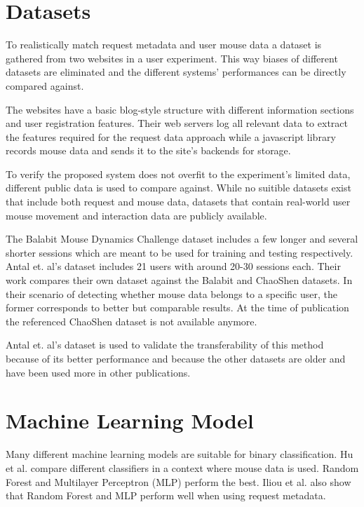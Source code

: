 \documentclass[
    fontsize=12pt,
    headings=small,
    parskip=half,           %
    bibliography=totoc,
    numbers=noenddot,       %
    open=any,               %
    final,                   %
    table
]{scrreprt}
\begin{document}
\section{Datasets}

To realistically match request metadata and user mouse data a dataset is gathered from two websites in a user experiment. This way biases of different datasets are eliminated and the different systems' performances can be directly compared against.

The websites have a basic blog-style structure with different information sections and user registration features. Their web servers log all relevant data to extract the features required for the request data approach while a javascript library records mouse data and sends it to the site's backends for storage.

To verify the proposed system does not overfit to the experiment's limited data, different public data is used to compare against. While no suitible datasets exist that include both request and mouse data, datasets that contain real-world user mouse movement and interaction data are publicly available.

The Balabit Mouse Dynamics Challenge dataset \cite{BALABIT_CHALLENGE} includes a few longer and several shorter sessions which are meant to be used for training and testing respectively.
Antal et. al's dataset \cite{9111596} includes 21 users with around 20-30 sessions each. Their work compares their own dataset against the Balabit and ChaoShen datasets. In their scenario of detecting whether mouse data belongs to a specific user, the former corresponds to better but comparable results.
At the time of publication the referenced ChaoShen dataset is not available anymore.

Antal et. al's dataset is used to validate the transferability of this method because of its better performance and because the other datasets are older and have been used more in other publications.


\section{Machine Learning Model}

Many different machine learning models are suitable for binary classification. Hu et al. \cite{8275816} compare different classifiers in a context where mouse data is used. Random Forest and Multilayer Perceptron (MLP) perform the best.
Iliou et al. \cite{10.1145/3339252.3339267} also show that Random Forest and MLP perform well when using request metadata.
\end{document}
